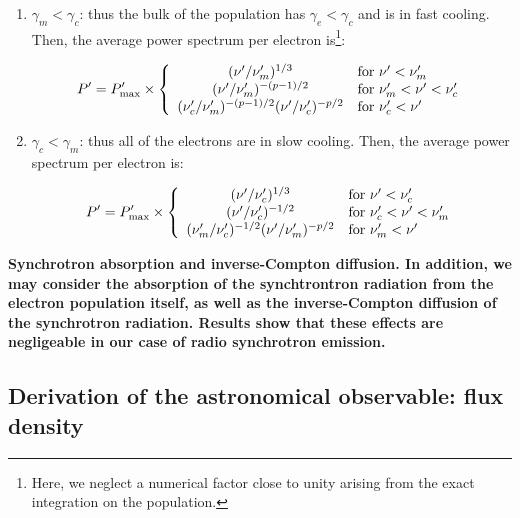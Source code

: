 \begin{enumerate}
    \item $\gamma_m < \gamma_c$: thus the bulk of the population has $\gamma_e < \gamma_c$ and is in fast cooling. Then, the average power spectrum per electron is\footnote{Here, we neglect a numerical factor close to unity arising from the exact integration on the population.}:

    \begin{equation}
        \label{s1}
        P^{\prime} = P_{\mathrm{max}}^{\prime} \times \left\{ \begin{array}{cl}
                         (\nu^{\prime}/\nu^{\prime}_m)^{1/3} & \text{for } \nu^{\prime} < \nu^{\prime}_m \\
                         (\nu^{\prime}/\nu^{\prime}_m)^{-(p-1)/2} & \text{for }  \nu^{\prime}_m < \nu^{\prime} < \nu^{\prime}_c \\
                         (\nu^{\prime}_c/\nu^{\prime}_m)^{-(p-1)/2}(\nu^{\prime}/\nu^{\prime}_c)^{-p/2} & \text{for }  \nu^{\prime}_c < \nu^{\prime}
                         \end{array}\right.
    \end{equation}

    \item $\gamma_c < \gamma_m$: thus all of the electrons are in slow cooling. Then, the average power spectrum per electron is:

    \begin{equation}
        \label{s2}
        P^{\prime} = P_{\mathrm{max}}^{\prime} \times \left\{ \begin{array}{cl}
            (\nu^{\prime}/\nu^{\prime}_c)^{1/3} & \text{for }  \nu^{\prime} < \nu^{\prime}_c \\
            (\nu^{\prime}/\nu^{\prime}_c)^{-1/2} & \text{for }  \nu^{\prime}_c < \nu^{\prime} < \nu^{\prime}_m \\
            (\nu^{\prime}_m/\nu^{\prime}_c)^{-1/2}(\nu^{\prime}/\nu^{\prime}_m)^{-p/2} & \text{for }  \nu^{\prime}_m < \nu^{\prime}
                         \end{array}\right.
    \end{equation}
\end{enumerate}

\bf{Synchrotron absorption and inverse-Compton diffusion.} In addition, we may consider the absorption of the synchtrontron radiation from the electron population itself, as well as the inverse-Compton diffusion of the synchrotron radiation. Results show  \citep[see e.g][]{1} that these effects are negligeable in our case of radio synchrotron emission.

\subsection{Derivation of the astronomical observable: flux density}

